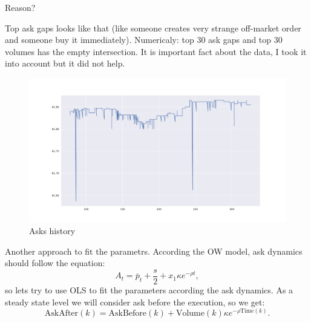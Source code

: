 \documentclass[aspectratio=169]{beamer}
\begin{document}
\begin{frame}{Reason?}

 Top ask gaps looks like that (like someone creates very strange off-market order and someone buy it immediately). Numericaly: top 30 ask gaps and top 30 
 volumes has the empty intersection. It is important fact about the data, I took it into account but it did not help.
        \begin{figure}
            \includegraphics[scale=0.25]{figs/Palki.pdf}
            \caption{Asks history}
            \label{fig:mvslim}
        \end{figure}
\end{frame}


\begin{frame}{Another approach to fit the parametrs.}
    According the OW model, ask dynamics should follow the equation:
    \begin{equation*}
        A_t = \overline p _t + \frac{s}{2} + x_1 \kappa e^{- \rho t},
    \end{equation*}
    so lets try to use OLS to fit the parameters according the ask dynamics. As a steady state level we will consider ask before the execution, so we get:
    \begin{equation*}
        \textrm{AskAfter}(k) = \textrm{AskBefore}(k) + \textrm{Volume}(k) \kappa e^{- \rho \textrm{Time}(k)}.
    \end{equation*}
\end{frame}
\end{document}
